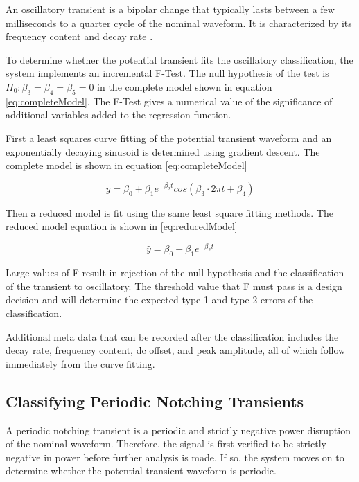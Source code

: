 \documentclass[10pt,conference,compsocconf]{IEEEtran}
\begin{document}
An oscillatory transient is a bipolar change that typically lasts between a few milliseconds to a quarter cycle of the nominal waveform. It is characterized by its frequency content and decay rate \cite{IEEE:2018:1159D3}. 

To determine whether the potential transient fits the oscillatory classification, the system implements an incremental F-Test. The null hypothesis of the test is  $H_0: \beta_3 = \beta_4 = \beta_5 = 0$ in the complete model shown in equation \ref{eq:completeModel}. The F-Test gives a numerical value of the significance of additional variables added to the regression function. 

First a least squares curve fitting of the potential transient waveform and an exponentially decaying sinusoid is determined using gradient descent. The complete model is shown in equation \ref{eq:completeModel}

\begin{equation}
\label{eq:completeModel}
\hat{y} = \beta_0 + \beta_1 e^{-\beta_2 t} cos(\beta_3 \cdot 2 \pi t + \beta_4)
\end{equation}

Then a reduced model is fit using the same least square fitting methods. The reduced model equation is shown in \ref{eq:reducedModel}

\begin{equation}
\label{eq:reducedModel}
\hat{y} = \beta_0 + \beta_1 e^{-\beta_2 t}
\end{equation}

Large values of F result in rejection of the null hypothesis and the classification of the transient to oscillatory. The threshold value that F must pass is a design decision and will determine the expected type 1 and type 2 errors of the classification. 

Additional meta data that can be recorded after the classification includes the decay rate, frequency content, dc offset, and peak amplitude, all of which follow immediately from the curve fitting. 

\subsection{Classifying Periodic Notching Transients}

A periodic notching transient is a periodic and strictly negative power disruption of the nominal waveform. Therefore, the signal is first verified to be strictly negative in power before further analysis is made. If so, the system moves on to determine whether the potential transient waveform is periodic. 
\end{document}
